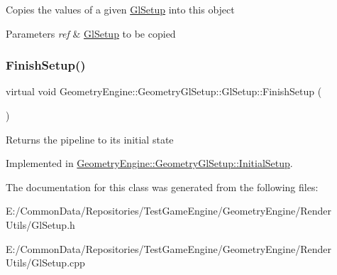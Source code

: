 Copies the values of a given \mbox{\hyperlink{class_geometry_engine_1_1_geometry_gl_setup_1_1_gl_setup}{Gl\+Setup}} into this object 
\begin{DoxyParams}{Parameters}
{\em ref} & \mbox{\hyperlink{class_geometry_engine_1_1_geometry_gl_setup_1_1_gl_setup}{Gl\+Setup}} to be copied \\
\hline
\end{DoxyParams}
\mbox{\label{class_geometry_engine_1_1_geometry_gl_setup_1_1_gl_setup_a6233d780b8ba17d9fd26f2aef0df26aa}} 
\subsubsection{\texorpdfstring{FinishSetup()}{FinishSetup()}}
{\footnotesize\ttfamily virtual void Geometry\+Engine\+::\+Geometry\+Gl\+Setup\+::\+Gl\+Setup\+::\+Finish\+Setup (\begin{DoxyParamCaption}{ }\end{DoxyParamCaption})\hspace{0.3cm}{\ttfamily [pure virtual]}}

\begin{DoxyReturn}{Returns}
the pipeline to its initial state 
\end{DoxyReturn}


Implemented in \mbox{\hyperlink{class_geometry_engine_1_1_geometry_gl_setup_1_1_initial_setup_a4ba4e34bcc09a800ab98dbe3181f1263}{Geometry\+Engine\+::\+Geometry\+Gl\+Setup\+::\+Initial\+Setup}}.



The documentation for this class was generated from the following files\+:\begin{DoxyCompactItemize}
\item 
E\+:/\+Common\+Data/\+Repositories/\+Test\+Game\+Engine/\+Geometry\+Engine/\+Render Utils/Gl\+Setup.\+h\item 
E\+:/\+Common\+Data/\+Repositories/\+Test\+Game\+Engine/\+Geometry\+Engine/\+Render Utils/Gl\+Setup.\+cpp\end{DoxyCompactItemize}
